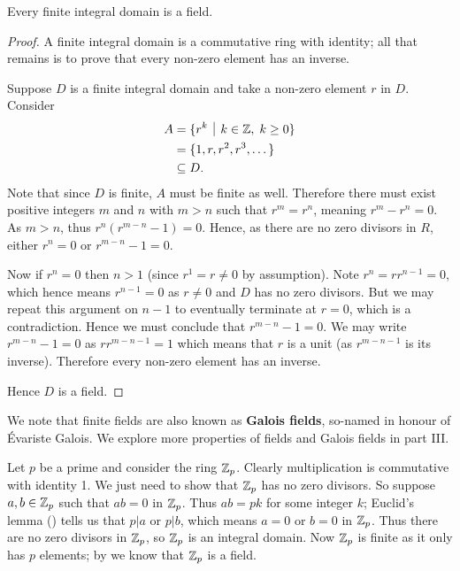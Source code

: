 \begin{theorem}\label{thrm-finite-integral-domain-is-field}
    Every finite integral domain is a field.
\end{theorem}
\begin{proof}
    A finite integral domain is a commutative ring with identity; all that remains is to prove that every non-zero element has an inverse.

    Suppose $D$ is a finite integral domain and take a non-zero element $r$ in $D$. Consider
    \begin{align*}
        A &= \{r^k \vert k \in \Z,\;k\geq 0\}\\
        &= \{1, r, r^2, r^3, \dots\}\\
        &\subseteq D.
    \end{align*}
    Note that since $D$ is finite, $A$ must be finite as well. Therefore there must exist positive integers $m$ and $n$ with $m > n$ such that $r^m = r^n$, meaning $r^m - r^n = 0$. As $m > n$, thus $r^n\left(r^{m-n}-1\right) = 0$. Hence, as there are no zero divisors in $R$, either $r^n = 0$ or $r^{m-n} - 1 = 0$.

    Now if $r^n = 0$ then $n > 1$ (since $r^1 = r \neq 0$ by assumption). Note $r^n = rr^{n-1} = 0$, which hence means $r^{n-1} = 0$ as $r \neq 0$ and $D$ has no zero divisors. But we may repeat this argument on $n - 1$ to eventually terminate at $r = 0$, which is a contradiction. Hence we must conclude that $r^{m-n} - 1 = 0$. We may write $r^{m-n}-1 = 0$ as $rr^{m-n-1} = 1$ which means that $r$ is a unit (as $r^{m-n-1}$ is its inverse). Therefore every non-zero element has an inverse.

    Hence $D$ is a field.
\end{proof}

\begin{remark}
    We note that finite fields are also known as \textbf{Galois fields}, so-named in honour of \'Evariste Galois. We explore more properties of fields and Galois fields in part III.
\end{remark}

\begin{example}\label{example-Zp-is-field}
    Let $p$ be a prime and consider the ring $\mathbb{Z}_p$. Clearly multiplication is commutative with identity 1. We just need to show that $\mathbb{Z}_p$ has no zero divisors. So suppose $a,b \in \mathbb{Z}_p$ such that $ab = 0$ in $\mathbb{Z}_p$. Thus $ab = pk$ for some integer $k$; Euclid's lemma () tells us that $p \vert a$ or $p \vert b$, which means $a = 0$ or $b = 0$ in $\mathbb{Z}_p$. Thus there are no zero divisors in $\mathbb{Z}_p$, so $\mathbb{Z}_p$ is an integral domain. Now $\mathbb{Z}_p$ is finite as it only has $p$ elements; by  we know that $\mathbb{Z}_p$ is a field.
\end{example}

